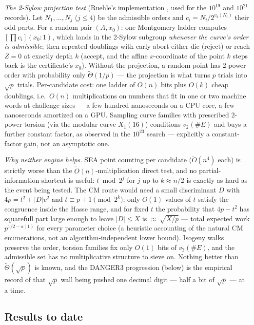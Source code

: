 \documentclass[11pt]{amsart}
\newcommand{\Ot}{\widetilde{O}}
\newcommand{\Tt}{\widetilde{\Theta}}
\theoremstyle{plain}
\theoremstyle{definition}
\theoremstyle{remark}
\begin{document}
\emph{The 2-Sylow projection test} (Ruehle's implementation \cite{Rue26}, used for the $10^{19}$ and
$10^{21}$ records).  Let $N_1,\dots,N_j$ ($j \le 4$) be the admissible orders and
$c_i = N_i/2^{v_2(N_i)}$ their odd parts.  For a random pair $(A, x_0)$: one Montgomery ladder computes
$[\prod c_i](x_0 : 1)$, which lands in the 2-Sylow subgroup \emph{whenever the curve's order is
admissible}; then repeated doublings with early abort either die (reject) or reach $Z = 0$ at exactly
depth $k$ (accept, and the affine $x$-coordinate of the point $k$ steps back is the certificate's
$x_0$).  Without the projection, a random point has 2-power order with probability only $\Tt(1/p)$ ---
the projection is what turns $p$ trials into $\sqrt p$ trials.  Per-candidate cost: one ladder of $O(n)$
bits plus $O(k)$ cheap doublings, i.e.\ $O(n)$ multiplications on numbers that fit in one or two machine
words at challenge sizes --- a few hundred nanoseconds on a CPU core, a few nanoseconds amortized on a
GPU.  Sampling curve families with prescribed 2-power torsion (via the modular curve $X_1(16)$)
conditions $v_2(\#E)$ and buys a further constant factor, as observed in the $10^{23}$ search
\cite{McL26} --- explicitly a constant-factor gain, not an asymptotic one.

\emph{Why neither engine helps.}  SEA point counting per candidate ($\Ot(n^4)$ each) is strictly worse
than the $\Ot(n)$-multiplication direct test, and no partial-information shortcut is useful:
$t \bmod 2^j$ for $j$ up to $k \approx n/2$ is exactly as hard as the event being tested.  The CM route
would need a small discriminant $D$ with $4p = t^2+|D|v^2$ and $t \equiv p+1 \pmod{2^k}$; only $O(1)$
values of $t$ satisfy the congruence inside the Hasse range, and for fixed $t$ the probability that
$4p-t^2$ has squarefull part large enough to leave $|D| \le X$ is ${\approx}\,\sqrt{X/p}$ --- total
expected work $p^{1/2-o(1)}$ for every parameter choice (a heuristic accounting of the natural CM
enumerations, not an algorithm-independent lower bound).  Isogeny walks preserve the order, torsion families fix only
$O(1)$ bits of $v_2(\#E)$, and the admissible set has no multiplicative structure to sieve on.  Nothing
better than $\Tt(\sqrt p)$ is known, and the DANGER3 progression (below) is the empirical record of that
$\sqrt p$ wall being pushed one decimal digit --- half a bit of $\sqrt p$ --- at a time.

\subsection{Results to date}\label{sec:pomresults}
\end{document}
